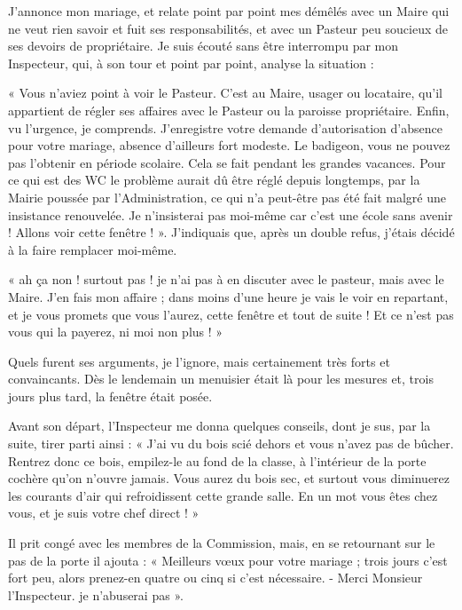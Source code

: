 J’annonce mon mariage, et relate point par point mes démêlés avec un Maire qui ne veut rien
savoir et fuit ses responsabilités, et avec un Pasteur peu soucieux de ses devoirs de
propriétaire.
Je suis écouté sans être interrompu par mon Inspecteur, qui, à son tour et point par point,
analyse la situation :

« Vous n’aviez point à voir le Pasteur. C’est au Maire, usager ou locataire, qu’il appartient de
régler ses affaires avec le Pasteur ou la paroisse propriétaire. Enfin, vu l’urgence, je
comprends.
J’enregistre votre demande d’autorisation d’absence pour votre mariage, absence d’ailleurs
fort modeste. Le badigeon, vous ne pouvez pas l’obtenir en période scolaire. Cela se fait
pendant les grandes vacances. Pour ce qui est des WC le problème aurait dû être réglé depuis
longtemps, par la Mairie poussée par l’Administration, ce qui n’a peut-être pas été fait malgré
une insistance renouvelée. Je n’insisterai pas moi-même car c’est une école sans
avenir ! Allons voir cette fenêtre ! ».
J’indiquais que, après un double refus, j’étais décidé à la faire remplacer moi-même.

« ah ça non ! surtout pas ! je n’ai pas à en discuter avec le pasteur, mais avec le Maire. J’en
fais mon affaire ; dans moins d’une heure je vais le voir en repartant, et je vous promets que
vous l’aurez, cette fenêtre et tout de suite ! Et ce n’est pas vous qui la payerez, ni moi non
plus ! »

Quels furent ses arguments, je l’ignore, mais certainement très forts et convaincants. Dès le
lendemain un menuisier était là pour les mesures et, trois jours plus tard, la fenêtre était posée.

Avant son départ, l’Inspecteur me donna quelques conseils, dont je sus, par la suite, tirer
parti ainsi :
« J’ai vu du bois scié dehors et vous n’avez pas de bûcher. Rentrez donc ce bois, empilez-le
au fond de la classe, à l’intérieur de la porte cochère qu’on n’ouvre jamais. Vous aurez du bois
sec, et surtout vous diminuerez les courants d’air qui refroidissent cette grande salle. En un
mot vous êtes chez vous, et je suis votre chef direct ! »


Il prit congé avec les membres de la Commission, mais, en se retournant sur le pas de la porte
il ajouta :
« Meilleurs vœux pour votre mariage ; trois jours c’est fort peu, alors prenez-en quatre ou
cinq si c’est nécessaire.
- Merci Monsieur l’Inspecteur. je n’abuserai pas ».

